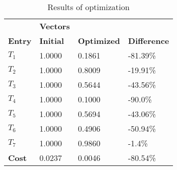 \begin{table}[H]
\centering
\begin{tabular}{llll}
\textbf{}      & \cellcolor[HTML]{EFEFEF}\textbf{Vectors} & \textbf{} & \textbf{}         \\
\rowcolor[HTML]{EFEFEF} 
\textbf{Entry} & \textbf{Initial} & \textbf{Optimized} & \textbf{Difference} \\
$T_1$ & 1.0000 & 0.1861 & -81.39\% \\ 
$T_2$ & 1.0000 & 0.8009 & -19.91\% \\ 
$T_3$ & 1.0000 & 0.5644 & -43.56\% \\ 
$T_4$ & 1.0000 & 0.1000 & -90.0\% \\ 
$T_5$ & 1.0000 & 0.5694 & -43.06\% \\ 
$T_6$ & 1.0000 & 0.4906 & -50.94\% \\ 
$T_7$ & 1.0000 & 0.9860 & -1.4\% \\ 
\rowcolor[HTML]{EFEFEF} 
\textbf{Cost}  & 0.0237 & 0.0046 & -80.54\% \\ 
\end{tabular}
\caption{Results of optimization}
\label{tab:OptimizationAnalysis}
\end{table}